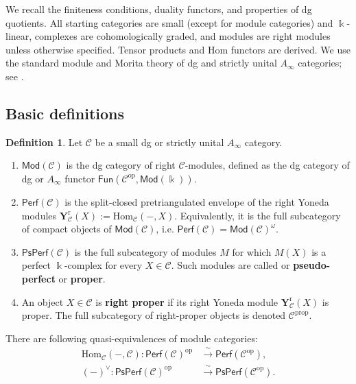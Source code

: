 \documentclass[11pt,letterpaper,reqno]{amsart}
\theoremstyle{plain}
\theoremstyle{definition}
\newtheorem{definition}[definition]{Definition}
\theoremstyle{plain}
\theoremstyle{definition}
\numberwithin{equation}{section}
\begin{document}
We recall the finiteness conditions, duality functors, and properties of dg quotients.
All starting categories are small (except for module categories) and $\Bbbk$-linear, complexes are cohomologically graded, and modules are right modules unless otherwise specified.
Tensor products and Hom functors are derived.
We use the standard module and Morita theory of dg and strictly unital $A_\infty$ categories; see \cite{Keller2006a,Keller2006b,Toen2007,Seidel2008}.

\subsection{Basic definitions}
\begin{definition}\label{def:perf-prop}
	Let $\mathscr{C}$ be a small dg or strictly unital $A_\infty$ category.
	\begin{enumerate}
		\item $\mathsf{Mod}(\mathscr{C})$ is the dg category of right $\mathscr{C}$-modules, defined as the dg category of dg or $A_\infty$ functor $\mathsf{Fun}(\mathscr{C}^{\mathrm{op}},\mathsf{Mod}(\Bbbk))$.
		
		\item $\mathsf{Perf}(\mathscr{C})$ is the split-closed pretriangulated envelope of
		the right Yoneda modules $\mathbf{Y}_{\mathscr{C}}^{\mathrm{r}}(X):=\mathrm{Hom}_{\mathscr{C}}(-,X)$.  Equivalently, it is the full subcategory of compact objects of $\mathsf{Mod}(\mathscr{C})$, i.e. $\mathsf{Perf}(\mathscr{C})=\mathsf{Mod}(\mathscr{C})^{\omega}$.
		
		\item $\mathsf{PsPerf}(\mathscr{C})$ is the full subcategory of modules $M$ for which $M(X)$ is a perfect $\Bbbk$-complex for every $X\in\mathscr{C}$. Such modules are called or \textbf{pseudo-perfect} or \textbf{proper}.
		
		\item An object $X\in\mathscr{C}$ is \textbf{right proper} if its right Yoneda module $\mathbf{Y}_{\mathscr{C}}^{\mathrm{r}}(X)$ is proper.  The full subcategory of right-proper objects is denoted $\mathscr{C}^{\mathrm{prop}}$.
	\end{enumerate}
\end{definition}


There are following quasi-equivalences of module categories:
\begin{eqnarray}\label{eq:op-equivalence}
\mathrm{Hom}_{\mathscr{C}}(-,\mathscr{C}) : \mathsf{Perf}(\mathscr{C})^{\mathrm{op}} &\xrightarrow{\;\sim\;} \mathsf{Perf}(\mathscr{C}^{\mathrm{op}}) , \label{eq:perf-op-equivalence}\\ 
(-)^\vee : \mathsf{PsPerf}(\mathscr{C})^{\mathrm{op}} &\xrightarrow{\;\sim\;} \mathsf{PsPerf}(\mathscr{C}^{\mathrm{op}}) .  \label{eq:psperf-op-equivalence}
\end{eqnarray}
\end{document}
